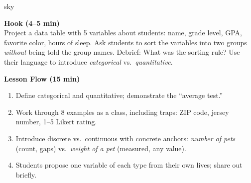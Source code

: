 \documentclass[10pt]{article}
\begin{document}
\begin{skillbox}{sky}
\begin{minipage}[t]{0.48\linewidth}
    \textbf{Hook (4--5 min)}\\
    Project a data table with 5 variables about students: name, grade level, GPA,
    favorite color, hours of sleep. Ask students to sort the variables into two
    groups \textit{without} being told the group names. Debrief: What was the
    sorting rule? Use their language to introduce \textit{categorical}
    vs.\ \textit{quantitative}.
\end{minipage}
\hfill
\begin{minipage}[t]{0.48\linewidth}
    \textbf{Lesson Flow (15 min)}
    \begin{enumerate}
        \item Define categorical and quantitative; demonstrate the ``average test.''
        \item Work through 8 examples as a class, including traps:
              ZIP code, jersey number, 1--5 Likert rating.
        \item Introduce discrete vs.\ continuous with concrete anchors:
              \textit{number of pets} (count, gaps) vs.\
              \textit{weight of a pet} (measured, any value).
        \item Students propose one variable of each type from their own lives;
              share out briefly.
    \end{enumerate}
\end{minipage}
\end{skillbox}
\end{document}
